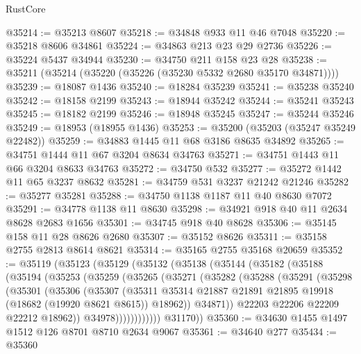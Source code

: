 \begin{lexlean}{RustCore}
\begin{coremodule}
@35214 := @35213 @8607
@35218 := @34848 @933 @11 @46 @7048
@35220 := @35218 @8606 @34861
@35224 := @34863 @213 @23 @29 @2736
@35226 := @35224 @5437 @34944
@35230 := @34750 @211 @158 @23 @28
@35238 := @35211 (@35214 (@35220 (@35226 (@35230 @5332 @2680 @35170 @34871))))
@35239 := @18087 @1436
@35240 := @18284 @35239
@35241 := @35238 @35240
@35242 := @18158 @2199
@35243 := @18944 @35242
@35244 := @35241 @35243
@35245 := @18182 @2199
@35246 := @18948 @35245
@35247 := @35244 @35246
@35249 := @18953 (@18955 @1436)
@35253 := @35200 (@35203 (@35247 @35249 @22482))
@35259 := @34883 @1445 @11 @68 @3186 @8635 @34892
@35265 := @34751 @1444 @11 @67 @3204 @8634 @34763
@35271 := @34751 @1443 @11 @66 @3204 @8633 @34763
@35272 := @34750 @532
@35277 := @35272 @1442 @11 @65 @3237 @8632
@35281 := @34759 @531 @3237 @21242 @21246
@35282 := @35277 @35281
@35288 := @34750 @1138 @1187 @11 @40 @8630 @7072
@35291 := @34778 @1138 @11 @8630
@35298 := @34921 @918 @40 @11 @2634 @8628 @2683 @1656
@35301 := @34745 @918 @40 @8628
@35306 := @35145 @158 @11 @28 @8626 @2680
@35307 := @35152 @8626
@35311 := @35158 @2755 @2813 @8614 @8621
@35314 := @35165 @2755 @35168 @20659
@35352 := @35119
    (@35123
      (@35129
        (@35132
          (@35138
            (@35144
              (@35182
                (@35188
                  (@35194
                    (@35253
                      (@35259
                        (@35265
                          (@35271
                            (@35282
                              (@35288
                                (@35291
                                  (@35298
                                    (@35301
                                      (@35306
                                        (@35307
                                          (@35311
                                            @35314
                                            @21887
                                            @21891
                                            @21895
                                            @19918
                                            (@18682 (@19920 @8621 @8615))
                                            @18962))
                                        @34871))
                                    @22203
                                    @22206
                                    @22209
                                    @22212
                                    @18962))
                                @34978))))))))))))
        @31170))
@35360 := @34630 @1455 @1497 @1512 @126 @8701 @8710 @2634 @9067
@35361 := @34640 @277
@35434 := @35360

\end{coremodule}
\end{lexlean}
